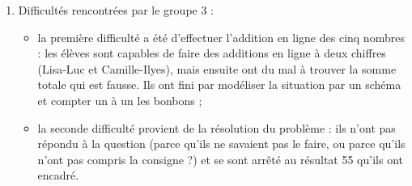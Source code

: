 \begin{enumerate}
\begin{enumerate}
\begin{itemize}
      \end{itemize}
   \end{enumerate}
   \item Difficultés rencontrées par le groupe 3 :
   \begin{itemize}
      \item la première difficulté a été d'effectuer l'addition en ligne des cinq nombres : les élèves sont capables de faire des additions en ligne à deux chiffres (Lisa-Luc et Camille-Ilyes), mais ensuite ont du mal à trouver la somme totale qui est fausse. Ils ont fini par modéliser la situation par un schéma et compter un à un les bonbons ;
      \item la seconde difficulté provient de la résolution du problème : ils n'ont pas répondu à la question (parce qu'ils ne savaient pas le faire, ou parce qu'ils n'ont pas compris la consigne ?) et se sont arrêté au résultat 55 qu'ils ont encadré.
   \end{itemize}
\end{enumerate}
